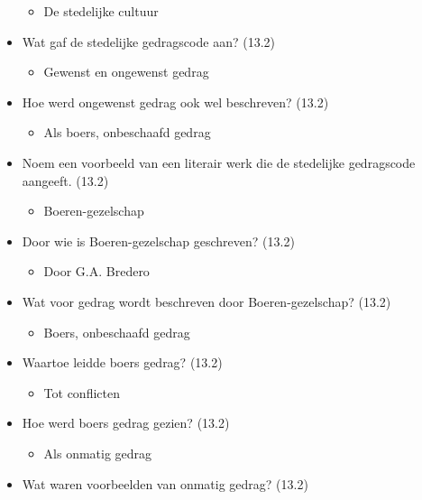 \begin{itemize}
  \begin{itemize}
  \itemsep1pt\parskip0pt
  \item
    De stedelijke cultuur
  \end{itemize}
\item
  Wat gaf de stedelijke gedragscode aan? (13.2)

  \begin{itemize}
  \itemsep1pt\parskip0pt
  \item
    Gewenst en ongewenst gedrag
  \end{itemize}
\item
  Hoe werd ongewenst gedrag ook wel beschreven? (13.2)

  \begin{itemize}
  \itemsep1pt\parskip0pt
  \item
    Als boers, onbeschaafd gedrag
  \end{itemize}
\item
  Noem een voorbeeld van een literair werk die de stedelijke gedragscode
  aangeeft. (13.2)

  \begin{itemize}
  \itemsep1pt\parskip0pt
  \item
    Boeren-gezelschap
  \end{itemize}
\item
  Door wie is Boeren-gezelschap geschreven? (13.2)

  \begin{itemize}
  \itemsep1pt\parskip0pt
  \item
    Door G.A. Bredero
  \end{itemize}
\item
  Wat voor gedrag wordt beschreven door Boeren-gezelschap? (13.2)

  \begin{itemize}
  \itemsep1pt\parskip0pt
  \item
    Boers, onbeschaafd gedrag
  \end{itemize}
\item
  Waartoe leidde boers gedrag? (13.2)

  \begin{itemize}
  \itemsep1pt\parskip0pt
  \item
    Tot conflicten
  \end{itemize}
\item
  Hoe werd boers gedrag gezien? (13.2)

  \begin{itemize}
  \itemsep1pt\parskip0pt
  \item
    Als onmatig gedrag
  \end{itemize}
\item
  Wat waren voorbeelden van onmatig gedrag? (13.2)


\end{itemize}
